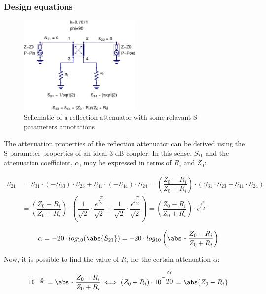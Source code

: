 \subsubsection{Design equations}
\begin{figure}[ht]
\begin{center}
\includegraphics[width=6cm]{bitmaps/synthesis/attenuators/Reflection-Attenuator-Power-Dissipation}
\end{center}
\caption{Schematic of a reflection attenuator with some relavant S-parameters annotations}
\label{fig:reflec-attenuator-schematic}
\end{figure}
\FloatBarrier

\noindent The attenuation properties of the reflection attenuator can be derived using the S-parameter properties of an ideal 3-dB coupler. In this sense, $S_{21}$ and the attenuation coefficient, $\alpha$, may be expressed in terms of $R_i$ and $Z_0$:


\begin{align}
S_{21} & = S_{31} \cdot (-S_{33}) \cdot S_{23} + S_{41} \cdot (-S_{44}) \cdot S_{24} = \left( \dfrac{Z_0 - R_i}{Z_0 + R_i} \right) \cdot (S_{31} \cdot S_{23} + S_{41} \cdot S_{24}) \\
 & = \left( \dfrac{Z_0 - R_i}{Z_0 + R_i} \right) \cdot \left( \dfrac{1}{\sqrt{2}} \cdot \dfrac{e^{j \dfrac{\pi}{2}}}{\sqrt{2}} + \dfrac{1}{\sqrt{2}} \cdot \dfrac{e^{j \dfrac{\pi}{2}}}{\sqrt{2}} \right) = \left( \dfrac{Z_{0} - R_{i}}{Z_{0} + R_{i}}\right) \cdot e^{j\dfrac{\pi}{2}}
\end{align}


\begin{equation}
\alpha = -20\cdot log_{10} (\abs{S_{21}}) = -20\cdot log_{10} \left(\abs*{\dfrac{Z_0 - R_i}{Z_0 + R_i}} \right)
\end{equation}

\noindent Now, it is possible to find the value of $R_{i}$ for the certain attenuation $\alpha$:

\begin{equation}
10^{-\frac{\alpha}{20}} = \abs*{\dfrac{Z_0 - R_i}{Z_0 + R_i}} \iff (Z_0 + R_i) \cdot 10^{-\dfrac{\alpha}{20}} = \abs{Z_{0} - R_i}
\end{equation}

